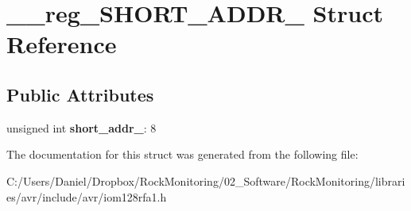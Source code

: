 \hypertarget{struct____reg___s_h_o_r_t___a_d_d_r__0}{}\section{\+\_\+\+\_\+reg\+\_\+\+S\+H\+O\+R\+T\+\_\+\+A\+D\+D\+R\+\_ Struct Reference}
\label{struct____reg___s_h_o_r_t___a_d_d_r__0}
\subsection*{Public Attributes}
\begin{DoxyCompactItemize}
\item 
unsigned int {\bfseries short\+\_\+addr\+\_}\+: 8\hypertarget{struct____reg___s_h_o_r_t___a_d_d_r__0_a634bb78e134bd5b1b7e9fc2343933608}{}\label{struct____reg___s_h_o_r_t___a_d_d_r__0_a634bb78e134bd5b1b7e9fc2343933608}

\end{DoxyCompactItemize}


The documentation for this struct was generated from the following file\+:\begin{DoxyCompactItemize}
\item 
C\+:/\+Users/\+Daniel/\+Dropbox/\+Rock\+Monitoring/02\+\_\+\+Software/\+Rock\+Monitoring/libraries/avr/include/avr/iom128rfa1.\+h\end{DoxyCompactItemize}

